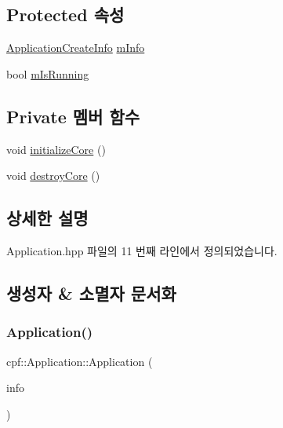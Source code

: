 \subsection*{Protected 속성}
\begin{DoxyCompactItemize}
\item 
\hyperlink{structcpf_1_1_application_create_info}{Application\+Create\+Info} \hyperlink{classcpf_1_1_application_aeef620fe71f2ac891e3650d6d3462b28}{m\+Info}
\item 
bool \hyperlink{classcpf_1_1_application_a84a6e2bafcc39719acee9885a064ac75}{m\+Is\+Running}
\end{DoxyCompactItemize}
\subsection*{Private 멤버 함수}
\begin{DoxyCompactItemize}
\item 
void \hyperlink{classcpf_1_1_application_a676898244f732414360ced11ed65379c}{initialize\+Core} ()
\item 
void \hyperlink{classcpf_1_1_application_aa65f415f1e0866cab063d83ab428ebbc}{destroy\+Core} ()
\end{DoxyCompactItemize}


\subsection{상세한 설명}


Application.\+hpp 파일의 11 번째 라인에서 정의되었습니다.



\subsection{생성자 \& 소멸자 문서화}
\mbox{\label{classcpf_1_1_application_a82aea6d89660d4ae9898a437f96d2e42}} 
\subsubsection{\texorpdfstring{Application()}{Application()}}
{\footnotesize\ttfamily cpf\+::\+Application\+::\+Application (\begin{DoxyParamCaption}\item[{const \hyperlink{structcpf_1_1_application_create_info}{Application\+Create\+Info} \&}]{info }\end{DoxyParamCaption})}




